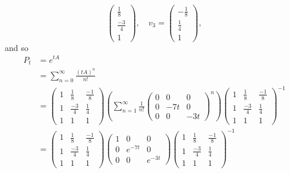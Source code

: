\documentclass[11pt]{article}
\begin{document}
\begin{enumerate}
\begin{solution}
\[\begin{pmatrix}
        \frac{1}{8} \\
        \frac{-3}{4}\\
        1
    \end{pmatrix}, \quad v_3 = \begin{pmatrix}
        -\frac{1}{8}\\
        \frac{1}{4}\\
        1
    \end{pmatrix},\] and so 
    \begin{align*}
        P_t &= e^{tA}\\
        &= \sum_{n=0}^\infty \frac{(tA)^n}{n!}\\
        &= \begin{pmatrix}
            1 & \frac{1}{8} & \frac{-1}{8}\\
            1 & \frac{-3}{4} & \frac{1}{4}\\
            1 & 1 & 1
        \end{pmatrix}\left(\sum_{n=1}^\infty \frac{1}{n!}\begin{pmatrix}
            0 & 0 & 0\\
            0 & -7t & 0\\
            0 & 0 &-3t
        \end{pmatrix}^n\right) \begin{pmatrix}
            1 & \frac{1}{8} & \frac{-1}{8}\\
            1 & \frac{-3}{4} & \frac{1}{4}\\
            1 & 1 & 1
        \end{pmatrix}^{-1}\\
        &= \begin{pmatrix}
            1 & \frac{1}{8} & \frac{-1}{8}\\
            1 & \frac{-3}{4} & \frac{1}{4}\\
            1 & 1 & 1
        \end{pmatrix}\begin{pmatrix}
            1 & 0 & 0\\
            0 & e^{-7t} & 0\\
            0 & 0 &e^{-3t}
        \end{pmatrix}\begin{pmatrix}
            1 & \frac{1}{8} & \frac{-1}{8}\\
            1 & \frac{-3}{4} & \frac{1}{4}\\
            1 & 1 & 1
        \end{pmatrix}^{-1}\\

\end{align*}
\end{solution}
\end{enumerate}
\end{document}
